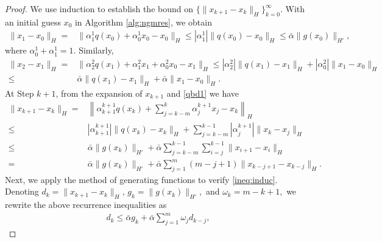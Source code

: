\documentclass[10pt,a4paper]{amsart}
\begin{document}
\begin{proof}
We use induction to establish the bound on  $\{ \|x_{k+1} - x_k\|_H \}_{k=0}^\infty$.
With an initial guess $x_0$ in Algorithm \ref{alg:ngmres}, we obtain 
\begin{align*}
 \|x_1  - x_0\|_{H} =&  \| \alpha^1_1 q(x_0) + \alpha_0^1 x_0 - x_0\|_{H} 
 \le  | \alpha^1_1| \| q(x_0) - x_0\|_{H} \le \bar \alpha \|g(x_0)\|_{H'},
\end{align*}
 where $\alpha_0^1+ \alpha_1^1 =1$. 
 Similarly,
 \begin{align*}
 \| x_2 - x_1\|_{H}  = & \| \alpha_2^2 q(x_1) + \alpha_1^2 x_1 + \alpha_0^2 x_0 - x_1\|_{H} 
 \le |\alpha_2^2| \| q(x_1)-x_1\|_H + |\alpha_0^2 | \| x_1-x_0\|_{H}
\\
  \le& \bar \alpha \| q(x_1)-x_1\|_H + \bar \alpha \| x_1-x_0\|_{H}.
 \end{align*}
At Step $k+1$, from the expansion of $x_{k+1}$ and \eqref{qbd1} we have
 \begin{align*}
 \| x_{k+1} - x_k\|_{H}  = & \left\| \alpha^{k+1}_{k+1} q(x_k) + \sum\limits_{j= k-m}^k \alpha_j^{k+1} x_j  - x_k \right\|_{H}
 \\
 \le & | \alpha^{k+1}_{k+1}|  \| q(x_k)  - x_k \|_{H}+ \sum\limits_{j= k-m}^{k-1} |\alpha_j^{k+1}| \| x_k - x_j\|_{H}
 \\
 \le & \bar \alpha \|g(x_k)\|_{H'} + \bar \alpha \sum\limits_{j=k-m}^{k-1} \sum\limits_{i = j }^{k-1} \| x_{i+1} - x_{i}\| _{H}
 \\
  = &  \bar \alpha \| g(x_k)\|_{H'} + \bar\alpha \sum_{j=1}^{m} (m-j+ 1) \|x_{k-j+1} - x_{k-j}\|_H.
 \end{align*}
Next, we apply the method of generating functions to verify \eqref{ineq:induc}. 
Denoting $ d_k = \|x_{k+1} - x_k\|_H,\, g_k = \| g(x_k)\|_{H'},$ and $\omega_k = m-k+1,$
we rewrite the above recurrence inequalities as
\begin{align*}
d_k \le \bar\alpha g_k + \bar\alpha \sum\limits_{j=1}^{m} \omega_j d_{k-j}, 
\end{align*}

\end{proof}
\end{document}
